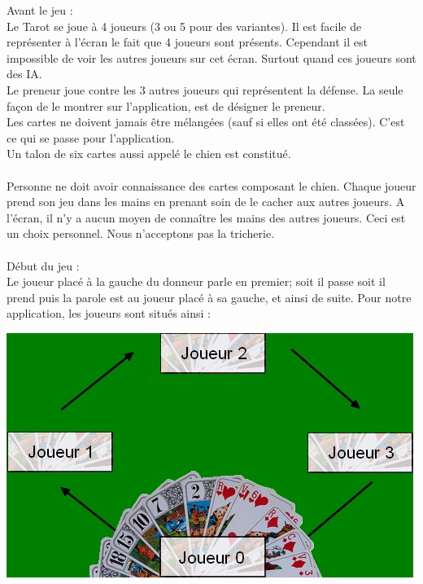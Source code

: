 \documentclass[a4paper]{report}
\begin{document}
		Avant le jeu :\\
   		Le Tarot se joue à 4 joueurs (3 ou 5 pour des variantes). Il est facile de représenter à l’écran le fait que 4 joueurs sont présents. Cependant il est impossible de voir les autres 			joueurs sur cet écran. Surtout quand ces joueurs sont des IA.\\
   		Le preneur joue contre les 3 autres joueurs qui représentent la défense. La seule façon de le montrer sur l’application, est de désigner le preneur.\\
    		Les cartes ne doivent jamais être mélangées (sauf si elles ont été classées). C’est ce qui se passe pour l’application.\\
   		Un talon de six cartes aussi appelé le chien est constitué.\\
		\\  
		Personne ne doit avoir connaissance des cartes composant le chien. Chaque joueur prend son jeu dans les mains en prenant soin de le cacher aux autres joueurs. A l’écran, il n’y a aucun 			moyen de connaître les mains des autres joueurs. Ceci est un choix personnel. Nous n’acceptons pas la tricherie.\\ 
		\\  
		Début du jeu :\\
   		Le joueur placé à la gauche du donneur parle en premier; soit il passe soit il prend puis la parole est au joueur placé à sa gauche, et ainsi de suite. Pour notre application, les 			joueurs sont situés ainsi :\\  
		\begin{center}
			\includegraphics[scale=0.7]{Images/placement.jpg}
		\end{center}
\end{document}

